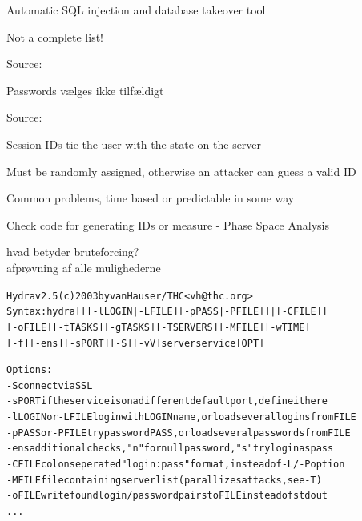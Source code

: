 \documentclass[Screen16to9,17pt]{foils}
\begin{document}
\begin{list1}
\item Automatic SQL injection and database takeover tool
\end{list1}




Not a complete list!

Source: 






Passwords vælges ikke tilfældigt


Source:





\begin{list2}
\item Session IDs tie the user with the state on the server
\item Must be randomly assigned, otherwise an attacker can guess a valid ID
\item Common problems, time based or predictable in some way
\item Check code for generating IDs or measure - Phase Space Analysis
\end{list2}



\begin{list1}
\item hvad betyder bruteforcing?\\
afprøvning af alle mulighederne
\end{list1}

\begin{alltt}\footnotesize
Hydra v2.5 (c) 2003 by van Hauser / THC <vh@thc.org>
Syntax: hydra [[[-l LOGIN|-L FILE] [-p PASS|-P FILE]] | [-C FILE]]
[-o FILE] [-t TASKS] [-g TASKS] [-T SERVERS] [-M FILE] [-w TIME]
[-f] [-e ns] [-s PORT] [-S] [-vV] server service [OPT]

Options:
  -S        connect via SSL
  -s PORT   if the service is on a different default port, define it here
  -l LOGIN  or -L FILE login with LOGIN name, or load several logins from FILE
  -p PASS   or -P FILE try password PASS, or load several passwords from FILE
  -e ns     additional checks, "n" for null password, "s" try login as pass
  -C FILE   colon seperated "login:pass" format, instead of -L/-P option
  -M FILE   file containing server list (parallizes attacks, see -T)
  -o FILE   write found login/password pairs to FILE instead of stdout
...
\end{alltt}
\end{document}
